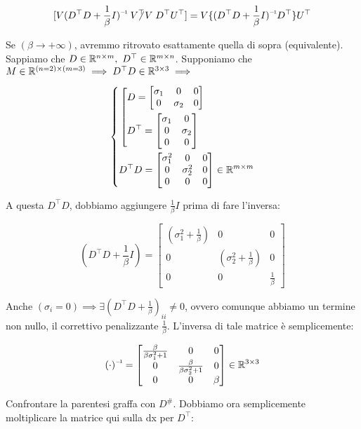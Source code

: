 \[
	[V\inv{(D^\top D + \frac{1}{\beta}I)}\centernot{V^\top V}D^\top U^\top] = V\{\inv{(D^\top D + \frac{1}{\beta}I)}D^\top\}U^\top
\]

Se $(\beta\to+\infty)$, avremmo ritrovato esattamente quella di sopra (equivalente). Sappiamo che $D\in\mathbb{R}^{n\times m},\ D^\top\in\mathbb{R}^{m\times n}$. Supponiamo che $M\in\mathbb{R}^{(n=2)\times(m=3)} \implies D^\top D\in\mathbb{R}^{3\times 3}\implies$

\[
	\left\{
	\begin{aligned}
	&\left[
	\begin{aligned}
	&D=\begin{bmatrix}\sigma_1&0&0\\0&\sigma_2&0\end{bmatrix}\\
	&D^\top=\begin{bmatrix}\sigma_1&0\\0&\sigma_2\\0&0\end{bmatrix}
	\end{aligned}
	\right.\\
	&D^\top D = \begin{bmatrix}\sigma_1^2&0&0\\0&\sigma_2^2&0\\0&0&0\end{bmatrix}\in\mathbb{R}^{m\times m}
	\end{aligned}
	\right.
\]

A questa $D^\top D$, dobbiamo aggiungere $\frac{1}{\beta}I$ prima di fare l'inversa:

\[
	(D^\top D + \frac{1}{\beta}I) = \begin{bmatrix}(\sigma_1^2+\frac{1}{\beta})&0&0\\0&(\sigma_2^2+\frac{1}{\beta})&0\\0&0&\frac{1}{\beta}\end{bmatrix}
\]

Anche $(\sigma_i=0)\implies\exists(D^\top D+\frac{1}{\beta})_{ii}\neq0$, ovvero comunque abbiamo un termine non nullo, il correttivo penalizzante $\frac{1}{\beta}$. L'inversa di tale matrice è semplicemente:

\[	
	\inv{(\mathord{\cdot})} = \begin{bmatrix}\frac{\beta}{\beta\sigma_1^2+1}&0&0\\0&\frac{\beta}{\beta\sigma_2^2+1}&0\\0&0&\beta\end{bmatrix}\in\R^{3\times 3}
\]

Confrontare la parentesi graffa con $D^\#$. Dobbiamo ora semplicemente moltiplicare la matrice qui sulla dx per $D^\top$:

